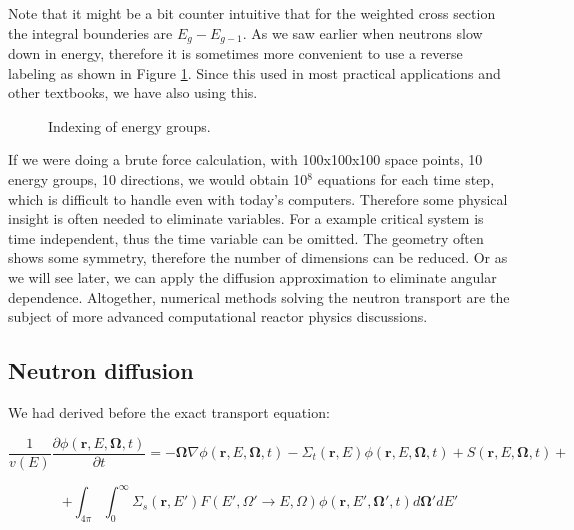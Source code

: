 Note that it might be a bit counter intuitive that for the weighted cross section the integral bounderies are $E_g - E_{g-1}$. As we saw earlier when neutrons slow down in energy, therefore it is sometimes more convenient to use a reverse labeling as shown in Figure \ref{fig:energygroups}. Since this used in most practical applications and other textbooks, we have also using this.

\begin{figure}[ht!]
\protect {}\protect
\caption{\label{fig:energygroups} \footnotesize{Indexing of energy groups.}}
\end{figure} 


If we were doing a brute force calculation, with 100x100x100 space points, 10 energy groups, 10 directions, we would obtain 10$^8$ equations for each time step, which is difficult to handle even with today's computers. Therefore some physical insight is often needed to eliminate variables. For a example critical system is time independent, thus the time variable can be omitted. The geometry often shows some symmetry, therefore the number of dimensions can be reduced. Or as we will see later, we can apply the diffusion approximation to eliminate angular dependence. Altogether, numerical methods solving the neutron transport are the subject of more advanced computational reactor physics discussions.

\subsection{Neutron diffusion}

We had derived before the exact transport equation:

\begin{equation}
\frac{1}{v(E)}\frac{\partial\phi(\mathbf{r},E,\mathbf{\Omega},t)}{\partial t}=-\mathbf{\Omega}\nabla\phi(\mathbf{r},E,\mathbf{\Omega},t)-\Sigma_t(\mathbf{r},E)\phi(\mathbf{r},E,\mathbf{\Omega},t)+S(\mathbf{r},E,\mathbf{\Omega},t) +
\end{equation}

\begin{equation*}
+\int_{4\pi}\int_{0}^\infty \Sigma_s(\mathbf{r},E')F(E',\Omega' \rightarrow E,\Omega)\phi(\mathbf{r},E',\mathbf{\Omega'},t)d\mathbf{\Omega'}dE'
\end{equation*}

